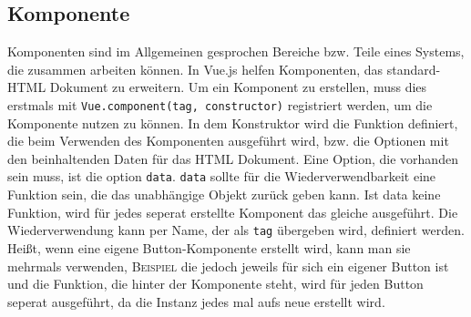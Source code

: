 \subsection*{Komponente}
Komponenten sind im Allgemeinen gesprochen Bereiche bzw. Teile eines Systems, die zusammen arbeiten k\"onnen.
In Vue.js helfen Komponenten, das standard-\ac{HTML} Dokument zu erweitern. 
Um ein Komponent zu erstellen, muss dies erstmals mit \texttt{Vue.component(tag, constructor)} registriert werden, um die Komponente nutzen zu k\"onnen\cite{VueDokumentationComponents2018}. In dem Konstruktor wird die Funktion definiert, die beim Verwenden des Komponenten ausgef\"uhrt wird, bzw. die Optionen mit den beinhaltenden Daten f\"ur das \ac{HTML} Dokument. Eine Option, die vorhanden sein muss, ist die option \texttt{data}. \texttt{data} sollte f\"ur die Wiederverwendbarkeit eine Funktion sein, die das unabh\"angige Objekt zur\"uck geben kann. Ist data keine Funktion, wird f\"ur jedes seperat erstellte Komponent das gleiche ausgef\"uhrt. Die Wiederverwendung kann per Name, der als \texttt{tag} \"ubergeben wird, definiert werden. Hei\ss{}t, wenn eine eigene Button-Komponente erstellt wird, kann man sie mehrmals verwenden, \textsc{Beispiel} die jedoch jeweils f\"ur sich ein eigener Button ist und die Funktion, die hinter der Komponente steht, wird f\"ur jeden Button seperat ausgef\"uhrt, da die Instanz jedes mal aufs neue erstellt wird\cite{VueDokumentationComponents2018}.